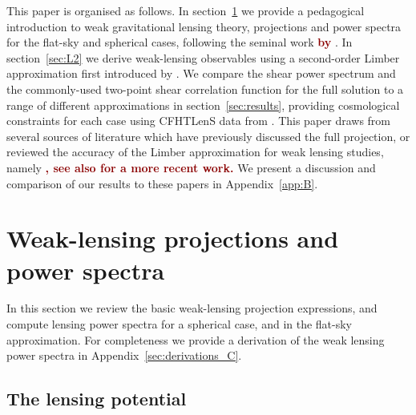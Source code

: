 \documentclass[fleqn,usenatbib]{mnras} %
\newcommand{\forref}[1]{{\bf\textcolor{darkred}{#1}}}
\begin{document}
This paper is organised as follows.  In section~\ref{sec:wl} we provide a
pedagogical introduction to weak gravitational lensing theory, projections and
power spectra for the flat-sky and spherical cases, following the seminal work
\forref{by} \citet{2000PhRvD..62d3007H} \cite[see also][]{2005PhRvD..72b3516C}. In
section~\ref{sec:L2} we derive weak-lensing observables using a second-order
Limber approximation first introduced by \citet{2008PhRvD..78l3506L}. We
compare the shear power spectrum and the commonly-used two-point shear
correlation function for the full solution to a range of different
approximations in section~\ref{sec:results}, providing cosmological constraints
for each case using CFHTLenS data from \citet{CFHTLenS-2pt-notomo}. This paper
draws from several sources of literature which have previously discussed the
full projection, or reviewed the accuracy of the Limber approximation for weak
lensing studies, namely \citet{2008PhRvD..78d3002S,2012PhRvD..86b3001B,
2012MNRAS.422.2854G, 2016arXiv161104954K}\forref{, see also
\cite{2017arXiv170401054L} for a more recent work.} We present a discussion and
comparison of our results to these papers in Appendix~\ref{app:B}.


\section{Weak-lensing projections and power spectra}
\label{sec:wl}

In this section we review the basic weak-lensing projection expressions, and
compute lensing power spectra for a spherical case, and in the flat-sky
approximation. For completeness we provide a derivation of the weak lensing
power spectra in Appendix~\ref{sec:derivations_C}.

\subsection{The lensing potential}
\label{sec:psi}
\end{document}
